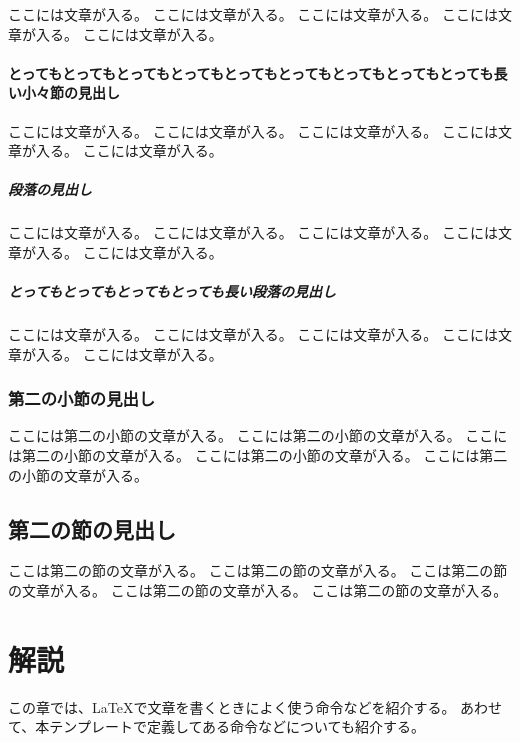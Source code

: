 \documentclass[ %
  uplatex,%
  a5paper,%
  papersize%
]{jsbook}
\begin{document}
ここには文章が入る。
ここには文章が入る。
ここには文章が入る。
ここには文章が入る。
ここには文章が入る。

\subsubsection{とってもとってもとってもとってもとってもとってもとってもとってもとっても長い小々節の見出し}

ここには文章が入る。
ここには文章が入る。
ここには文章が入る。
ここには文章が入る。
ここには文章が入る。

\paragraph{段落の見出し}

ここには文章が入る。
ここには文章が入る。
ここには文章が入る。
ここには文章が入る。
ここには文章が入る。

\paragraph{とってもとってもとってもとっても長い段落の見出し}

ここには文章が入る。
ここには文章が入る。
ここには文章が入る。
ここには文章が入る。
ここには文章が入る。

\subsection{第二の小節の見出し}

ここには第二の小節の文章が入る。
ここには第二の小節の文章が入る。
ここには第二の小節の文章が入る。
ここには第二の小節の文章が入る。
ここには第二の小節の文章が入る。

\section{第二の節の見出し}

ここは第二の節の文章が入る。
ここは第二の節の文章が入る。
ここは第二の節の文章が入る。
ここは第二の節の文章が入る。
ここは第二の節の文章が入る。

\chapter{解説}

\begin{summary}
この章では、\LaTeX で文章を書くときによく使う命令などを紹介する。
あわせて、本テンプレートで定義してある命令などについても紹介する。
\end{summary}
\end{document}
